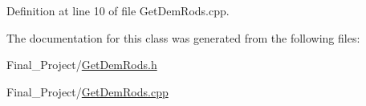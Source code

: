 Definition at line 10 of file Get\-Dem\-Rods.\-cpp.



The documentation for this class was generated from the following files\-:\begin{DoxyCompactItemize}
\item 
Final\-\_\-\-Project/\hyperlink{GetDemRods_8h}{Get\-Dem\-Rods.\-h}\item 
Final\-\_\-\-Project/\hyperlink{GetDemRods_8cpp}{Get\-Dem\-Rods.\-cpp}\end{DoxyCompactItemize}
